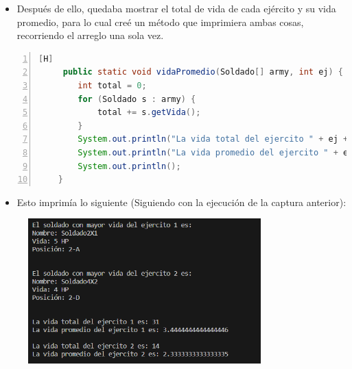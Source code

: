 \documentclass{article}
\begin{document}
	
	\begin{itemize}	
		\item Después de ello, quedaba mostrar el total de vida de cada ejército y su vida promedio, para lo cual creé un método que imprimiera ambas cosas, recorriendo el arreglo una sola vez.
	\end{itemize}
	\begin{lstlisting}[language=java,caption={Vida total y promedio}, numbers=left][H]
	 public static void vidaPromedio(Soldado[] army, int ej) {
        int total = 0;
        for (Soldado s : army) {
            total += s.getVida();
        }
        System.out.println("La vida total del ejercito " + ej + " es: " + total);
        System.out.println("La vida promedio del ejercito " + ej + " es: " + total / (1.0 * army.length));
        System.out.println();
    }
	\end{lstlisting}
	\begin{itemize}
		\item Esto imprimía lo siguiente (Siguiendo con la ejecución de la captura anterior):
	\end{itemize}
	
	\begin{figure}[H]
		\centering
	\includegraphics[width=0.8\textwidth,keepaspectratio]{img/captura2.png}
	\end{figure}
	
\end{document}

